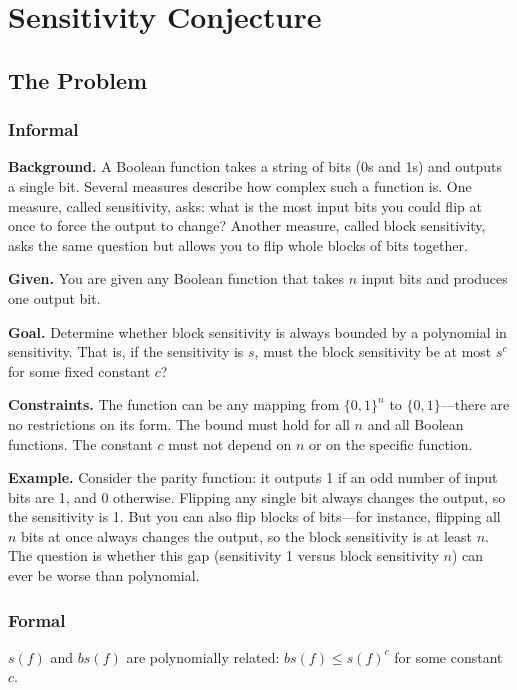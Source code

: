 \let\LocalMacro\relax

\chapter{Sensitivity Conjecture}

\section{The Problem}

\subsection{Informal}

\textbf{Background.} A Boolean function takes a string of bits (0s and 1s) and outputs a single bit. Several measures describe how complex such a function is. One measure, called sensitivity, asks: what is the most input bits you could flip at once to force the output to change? Another measure, called block sensitivity, asks the same question but allows you to flip whole blocks of bits together.

\textbf{Given.} You are given any Boolean function that takes $n$ input bits and produces one output bit.

\textbf{Goal.} Determine whether block sensitivity is always bounded by a polynomial in sensitivity. That is, if the sensitivity is $s$, must the block sensitivity be at most $s^c$ for some fixed constant $c$?

\textbf{Constraints.} The function can be any mapping from $\{0,1\}^n$ to $\{0,1\}$---there are no restrictions on its form. The bound must hold for all $n$ and all Boolean functions. The constant $c$ must not depend on $n$ or on the specific function.

\textbf{Example.} Consider the parity function: it outputs 1 if an odd number of input bits are 1, and 0 otherwise. Flipping any single bit always changes the output, so the sensitivity is 1. But you can also flip blocks of bits---for instance, flipping all $n$ bits at once always changes the output, so the block sensitivity is at least $n$. The question is whether this gap (sensitivity 1 versus block sensitivity $n$) can ever be worse than polynomial.

\subsection{Formal}
\begin{conjecture}
$s(f)$ and $bs(f)$ are polynomially related: $bs(f) \le s(f)^c$ for some constant $c$.
\end{conjecture}

